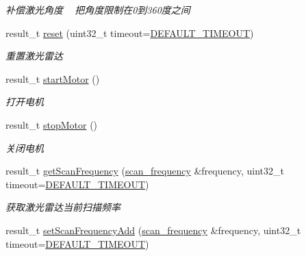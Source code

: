 \begin{DoxyCompactItemize}
\begin{DoxyCompactList}\small\item\em 补偿激光角度 ~\newline
把角度限制在0到360度之间 \end{DoxyCompactList}\item 
result\+\_\+t \hyperlink{classydlidar_1_1_y_dlidar_driver_a3dd4086c5685163f7c7487ea0f5af08c}{reset} (uint32\+\_\+t timeout=\hyperlink{classydlidar_1_1_y_dlidar_driver_a13a4f2dc4067b43794b2c47c06d5d27aa07c79ce96f468ff4b40495ef84584442}{D\+E\+F\+A\+U\+L\+T\+\_\+\+T\+I\+M\+E\+O\+UT})
\begin{DoxyCompactList}\small\item\em 重置激光雷达 ~\newline
\end{DoxyCompactList}\item 
result\+\_\+t \hyperlink{classydlidar_1_1_y_dlidar_driver_a2e686ef1ce60f3241352a798330f760b}{start\+Motor} ()
\begin{DoxyCompactList}\small\item\em 打开电机 ~\newline
\end{DoxyCompactList}\item 
result\+\_\+t \hyperlink{classydlidar_1_1_y_dlidar_driver_a6cdf0c5a7ddf2375c1392c3a0e65edfe}{stop\+Motor} ()
\begin{DoxyCompactList}\small\item\em 关闭电机 ~\newline
\end{DoxyCompactList}\item 
result\+\_\+t \hyperlink{classydlidar_1_1_y_dlidar_driver_a76efb701e137121b213f61028e3f235e}{get\+Scan\+Frequency} (\hyperlink{structscan__frequency}{scan\+\_\+frequency} \&frequency, uint32\+\_\+t timeout=\hyperlink{classydlidar_1_1_y_dlidar_driver_a13a4f2dc4067b43794b2c47c06d5d27aa07c79ce96f468ff4b40495ef84584442}{D\+E\+F\+A\+U\+L\+T\+\_\+\+T\+I\+M\+E\+O\+UT})
\begin{DoxyCompactList}\small\item\em 获取激光雷达当前扫描频率 ~\newline
\end{DoxyCompactList}\item 
result\+\_\+t \hyperlink{classydlidar_1_1_y_dlidar_driver_a0feea99573991bb4eb6f8e1718a71435}{set\+Scan\+Frequency\+Add} (\hyperlink{structscan__frequency}{scan\+\_\+frequency} \&frequency, uint32\+\_\+t timeout=\hyperlink{classydlidar_1_1_y_dlidar_driver_a13a4f2dc4067b43794b2c47c06d5d27aa07c79ce96f468ff4b40495ef84584442}{D\+E\+F\+A\+U\+L\+T\+\_\+\+T\+I\+M\+E\+O\+UT})

\end{DoxyCompactItemize}
